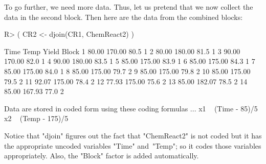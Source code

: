 \documentclass[article,nojss]{jss}
\begin{document}
To go further, we need more data.  Thus, let us pretend that we now collect the data in the second block. 
Then here are the data from the combined blocks:
\begin{Schunk}
\begin{Sinput}
R> ( CR2 <- djoin(CR1, ChemReact2) )
\end{Sinput}
\begin{Soutput}
    Time   Temp Yield Block
1  80.00 170.00  80.5     1
2  80.00 180.00  81.5     1
3  90.00 170.00  82.0     1
4  90.00 180.00  83.5     1
5  85.00 175.00  83.9     1
6  85.00 175.00  84.3     1
7  85.00 175.00  84.0     1
8  85.00 175.00  79.7     2
9  85.00 175.00  79.8     2
10 85.00 175.00  79.5     2
11 92.07 175.00  78.4     2
12 77.93 175.00  75.6     2
13 85.00 182.07  78.5     2
14 85.00 167.93  77.0     2

Data are stored in coded form using these coding formulas ...
x1 ~ (Time - 85)/5
x2 ~ (Temp - 175)/5
\end{Soutput}
\end{Schunk}
Notice that "djoin" figures out the fact that "ChemReact2" is not coded but it has the appropriate uncoded variables "Time" and~"Temp"; so it codes those variables appropriately. Also, the "Block" factor is added automatically.
\end{document}
